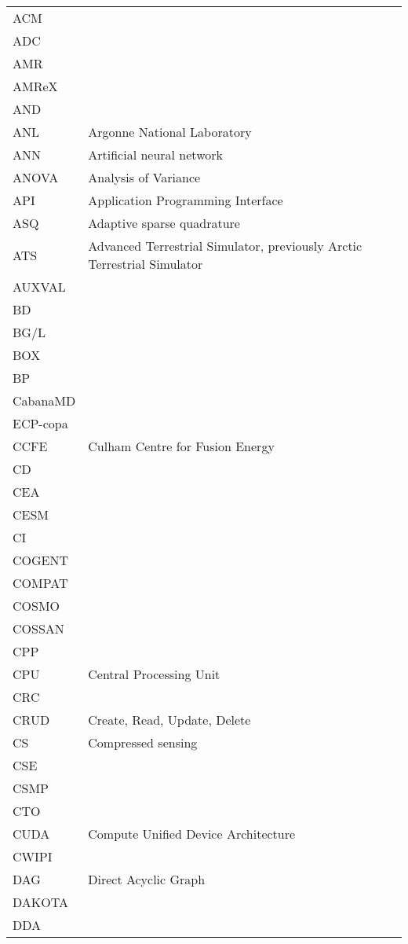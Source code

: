 \begin{longtable}{|p{4.0cm}|p{12.0cm}|}
\hline
ACM & \\
ADC & \\
AMR & \\
AMReX & \\
AND & \\
ANL & Argonne National Laboratory \\
ANN & Artificial neural network \\
ANOVA & Analysis of Variance \\
API & Application Programming Interface \\
ASQ & Adaptive sparse quadrature \\
ATS & Advanced Terrestrial Simulator, previously Arctic Terrestrial Simulator \\
AUXVAL & \\
BD & \\
BG/L & \\
BOX & \\
BP & \\
CabanaMD & \\
ECP-copa & \\
CCFE & Culham Centre for Fusion Energy \\
CD & \\
CEA  & \\
CESM & \\
CI & \\
COGENT & \\
COMPAT & \\
COSMO & \\
COSSAN & \\
CPP & \\
CPU & Central Processing Unit \\
CRC & \\
CRUD & Create, Read, Update, Delete \\
CS & Compressed sensing \\
CSE & \\
CSMP & \\
CTO & \\
CUDA & Compute Unified Device Architecture \\
CWIPI & \\
DAG & Direct Acyclic Graph \\
DAKOTA & \\
DDA & \\

\end{longtable}

